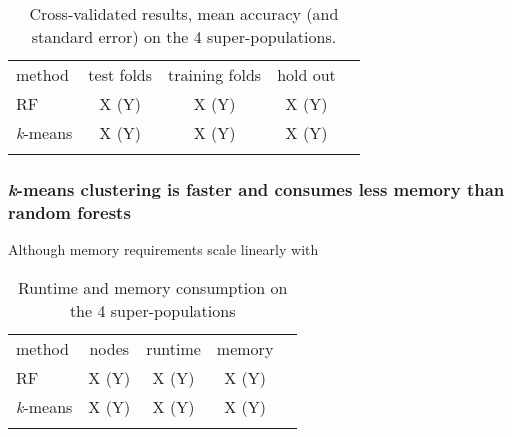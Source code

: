 \documentclass{llncs}
\newcommand{\kMeans}{\textit{k}-means}
\begin{document}
{%

\begin{table}
\caption{Cross-validated results, mean accuracy (and standard error) on the 4 super-populations.}
\begin{center}
\renewcommand{\arraystretch}{1.4}
\setlength\tabcolsep{3pt}
\begin{tabular}{lcccc}
\hline\noalign{\smallskip}
method  & test folds & training folds & hold out \\
RF  & X (Y) & X (Y) & X (Y) \\
\kMeans & X (Y) & X (Y) & X (Y) \\
\noalign{\smallskip}
\hline
\end{tabular}
\end{center}
\end{table}







\subsubsection{\kMeans{} clustering is faster and consumes less memory than random forests}

Although memory requirements scale linearly with 



\begin{table}
\caption{Runtime and memory consumption on the 4 super-populations}
\begin{center}
\renewcommand{\arraystretch}{1.4}
\setlength\tabcolsep{3pt}
\begin{tabular}{lcccc}
\hline\noalign{\smallskip}
method  & nodes & runtime & memory \\
RF  & X (Y) & X (Y) & X (Y) \\
\kMeans & X (Y) & X (Y) & X (Y) \\
\noalign{\smallskip}
\hline
\end{tabular}
\end{center}
\end{table}




}
\end{document}
